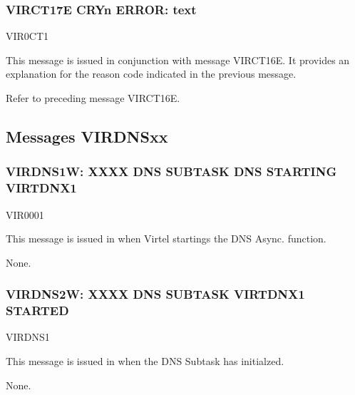 \documentclass[letterpaper,10pt,english]{sphinxmanual}
\begin{document}
\subsubsection{VIRCT17E CRYn ERROR: text}
\label{\detokenize{messages:virct17e-cryn-error-text}}\begin{description}
\sphinxAtStartPar
VIR0CT1

\sphinxAtStartPar
This message is issued in conjunction with message VIRCT16E. It provides an explanation for the reason code indicated in the previous message.

\sphinxAtStartPar
Refer to preceding message VIRCT16E.

\end{description}


\subsection{Messages VIRDNSxx}
\label{\detokenize{messages:messages-virdnsxx}}

\subsubsection{VIRDNS1W: XXXX DNS SUBTASK DNS STARTING VIRTDNX1}
\label{\detokenize{messages:virdns1w-xxxx-dns-subtask-dns-starting-virtdnx1}}\begin{description}
\sphinxAtStartPar
VIR0001

\sphinxAtStartPar
This message is issued in when Virtel startings the DNS Async. function.

\sphinxAtStartPar
None.

\end{description}


\subsubsection{VIRDNS2W: XXXX DNS SUBTASK VIRTDNX1 STARTED}
\label{\detokenize{messages:virdns2w-xxxx-dns-subtask-virtdnx1-started}}\begin{description}
\sphinxAtStartPar
VIRDNS1

\sphinxAtStartPar
This message is issued in when the DNS Subtask has initialzed.

\sphinxAtStartPar
None.

\end{description}
\end{document}
